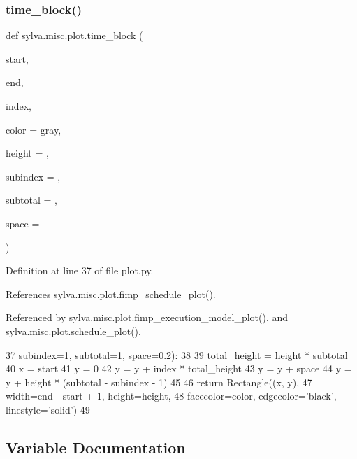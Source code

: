 \subsubsection{\texorpdfstring{time\+\_\+block()}{time\_block()}}
{\footnotesize\ttfamily def sylva.\+misc.\+plot.\+time\+\_\+block (\begin{DoxyParamCaption}\item[{}]{start,  }\item[{}]{end,  }\item[{}]{index,  }\item[{}]{color = {\ttfamily \textquotesingle{}gray\textquotesingle{}},  }\item[{}]{height = {},  }\item[{}]{subindex = {},  }\item[{}]{subtotal = {},  }\item[{}]{space = {} }\end{DoxyParamCaption})}



Definition at line 37 of file plot.\+py.



References sylva.\+misc.\+plot.\+fimp\+\_\+schedule\+\_\+plot().



Referenced by sylva.\+misc.\+plot.\+fimp\+\_\+execution\+\_\+model\+\_\+plot(), and sylva.\+misc.\+plot.\+schedule\+\_\+plot().


\begin{DoxyCode}
37                    subindex=1, subtotal=1, space=0.2):
38 
39         total\_height = height * subtotal
40         x = start
41         y = 0
42         y = y + index * total\_height
43         y = y + space
44         y = y + height * (subtotal - subindex - 1)
45 
46         \textcolor{keywordflow}{return} Rectangle((x, y),
47                          width=end - start + 1, height=height,
48                          facecolor=color, edgecolor=\textcolor{stringliteral}{'black'}, linestyle=\textcolor{stringliteral}{'solid'})
49 
\end{DoxyCode}


\subsection{Variable Documentation}
\mbox{\label{namespacesylva_1_1misc_1_1plot_a7500c696078a3d942b466b4627141020}} 
